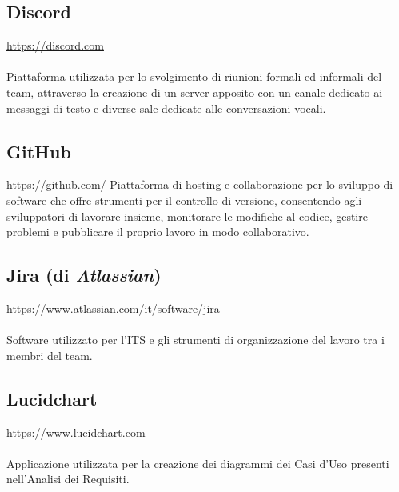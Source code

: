 \documentclass[10pt, a4paper]{article}
\begin{document}
\subsection{Discord}
\href{https://discord.com}{https://discord.com}\\\\
Piattaforma utilizzata per lo svolgimento di riunioni formali ed informali del team, attraverso la creazione di un server apposito con un canale dedicato ai messaggi di testo e diverse sale dedicate alle conversazioni vocali.

\subsection{GitHub}
\href{https://github.com/}{https://github.com/}
Piattaforma di hosting e collaborazione per lo sviluppo di software che offre strumenti per il controllo di versione, consentendo agli sviluppatori di lavorare insieme, monitorare le modifiche al codice, gestire problemi e pubblicare il proprio lavoro in modo collaborativo.

\subsection{Jira (di \textit{Atlassian})}
\href{https://www.atlassian.com/it/software/jira}{https://www.atlassian.com/it/software/jira}\\\\
Software utilizzato per l'ITS e gli strumenti di organizzazione del lavoro tra i membri del team.

\subsection{Lucidchart}
\href{https://www.lucidchart.com/pages/it/landing?utm_source=google&utm_medium=cpc&utm_campaign=_chart_it_allcountries_mixed_search_brand_exact_&km_CPC_CampaignId=9594860760&km_CPC_AdGroupID=99270039979&km_CPC_Keyword=lucidchart&km_CPC_MatchType=e&km_CPC_ExtensionID=&km_CPC_Network=g&km_CPC_AdPosition=&km_CPC_Creative=424699413281&km_CPC_TargetID=kwd-33511936169&km_CPC_Country=1008611&km_CPC_Device=c&km_CPC_placement=&km_CPC_target=&gad_source=1&gclid=CjwKCAiAu9yqBhBmEiwAHTx5p4TQe0-7u0ZhVN-N_fc86zgphNfT-Tl5YNwSklJXC8E3NH5yE9t0HRoCnmAQAvD_BwE}{https://www.lucidchart.com}\\\\
Applicazione utilizzata per la creazione dei diagrammi dei Casi d'Uso presenti nell'Analisi dei Requisiti.
\end{document}

